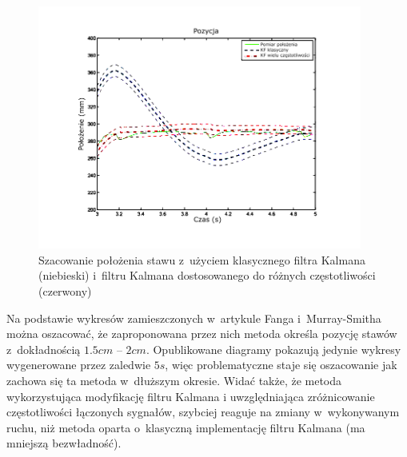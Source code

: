 \begin{savenotes}
	\begin{figure}[!htb]
		\centering 
		\includegraphics[width=0.95\textwidth]{images/Fig03.png}	
		\caption[Szacowanie położenia stawu z~użyciem klasycznego filtra Kalmana i~filtru Kalmana dostosowanego do różnych częstotliwości]{Szacowanie położenia stawu z~użyciem klasycznego filtra Kalmana (niebieski) i~filtru Kalmana dostosowanego do różnych częstotliwości (czerwony) \cite{Murray-Smith2014}}
		\label{fig:literature:feng}
	\end{figure}
\end{savenotes}

Na podstawie wykresów zamieszczonych w~artykule Fanga i~Murray-Smitha można oszacować, że zaproponowana przez nich metoda określa pozycję stawów z~dokładnością $1.5 cm$ -- $2 cm$. Opublikowane diagramy pokazują jedynie wykresy wygenerowane przez zaledwie $5s$, więc problematyczne staje się oszacowanie jak zachowa się ta metoda w~dłuższym okresie. Widać także, że metoda wykorzystująca modyfikację filtru Kalmana i uwzględniająca zróżnicowanie częstotliwości łączonych sygnałów, szybciej reaguje na zmiany w~wykonywanym ruchu, niż metoda oparta o~klasyczną implementację filtru Kalmana (ma mniejszą bezwładność).
									
